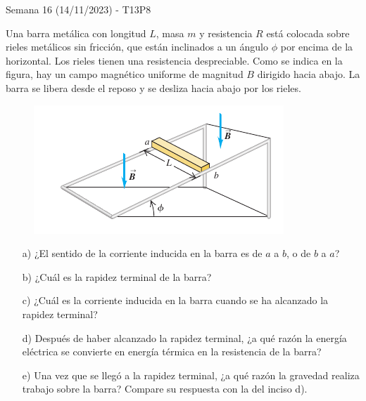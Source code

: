 \begin{frame}{Semana 16 (14/11/2023) - T13P8}
    
    \footnotesize
    
    Una barra metálica con longitud $L$, masa $m$ y resistencia $R$ está colocada sobre rieles metálicos sin fricción, que están inclinados a un ángulo $\phi$ por encima de la horizontal. Los rieles tienen una resistencia despreciable. Como se indica en la figura, hay un campo magnético uniforme de magnitud $B$ dirigido hacia abajo. La barra se libera desde el reposo y se desliza hacia abajo por los rieles.
    
    \begin{figure}
        \centering
        \includegraphics[scale=0.4]{figures/q11.png}
    \end{figure}
    
    \begin{itemize}
        \item[a)] ¿El sentido de la corriente inducida en la barra es de $a$ a $b$, o de $b$ a $a$?
        \item[b)] ¿Cuál es la rapidez terminal de la barra?
        \item[c)] ¿Cuál es la corriente inducida en la barra cuando se ha alcanzado la rapidez terminal?
        \item[d)] Después de haber alcanzado la rapidez terminal, ¿a qué razón la energía eléctrica se convierte en energía térmica en la resistencia de la barra?
        \item[e)] Una vez que se llegó a la rapidez terminal, ¿a qué razón la gravedad realiza trabajo sobre la barra? Compare su respuesta con la del inciso d).
    \end{itemize} 

\end{frame}

